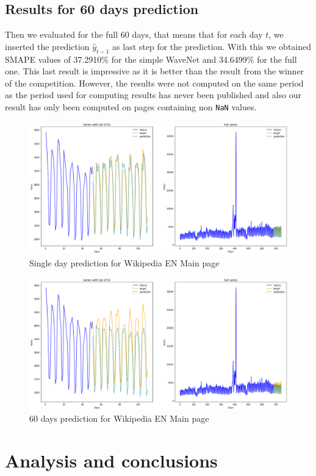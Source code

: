 \documentclass[11pt]{article}
\begin{document}
    \subsection{Results for 60 days prediction}
    Then we evaluated for the full 60 days, that means that for each day $t$, we inserted the prediction $\hat{y}_{t-1}$ as last step for the prediction. With this we obtained SMAPE values of 37.2910\% for the simple WaveNet and 34.6499\% for the full one. This last result is impressive as it is better than the result from the winner of the competition. However, the results were not computed on the same period as the period used for computing results has never been published and also our result has only been computed on pages containing non \verb+NaN+ values.
    \begin{figure}[H]
        \centering
        \includegraphics[width=\textwidth]{prediction_single.png}
        \caption{Single day prediction for Wikipedia EN Main page}
    \end{figure}
    \begin{figure}[H]
        \centering
        \includegraphics[width=\textwidth]{prediction.png}
        \caption{60 days prediction for Wikipedia EN Main page}
    \end{figure}
    \newpage
    \section{Analysis and conclusions}
\end{document}

